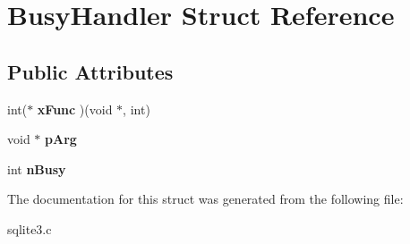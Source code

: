\hypertarget{structBusyHandler}{}\section{Busy\+Handler Struct Reference}
\label{structBusyHandler}
\subsection*{Public Attributes}
\begin{DoxyCompactItemize}
\item 
int($\ast$ {\bfseries x\+Func} )(void $\ast$, int)\hypertarget{structBusyHandler_a284037f3ffbbc94d95ec61c39ba8e468}{}\label{structBusyHandler_a284037f3ffbbc94d95ec61c39ba8e468}

\item 
void $\ast$ {\bfseries p\+Arg}\hypertarget{structBusyHandler_a1c793d2b815e79cf3684de46847551bd}{}\label{structBusyHandler_a1c793d2b815e79cf3684de46847551bd}

\item 
int {\bfseries n\+Busy}\hypertarget{structBusyHandler_aac4531c677ed5ae9e4757ca1b02c568b}{}\label{structBusyHandler_aac4531c677ed5ae9e4757ca1b02c568b}

\end{DoxyCompactItemize}


The documentation for this struct was generated from the following file\+:\begin{DoxyCompactItemize}
\item 
sqlite3.\+c\end{DoxyCompactItemize}
